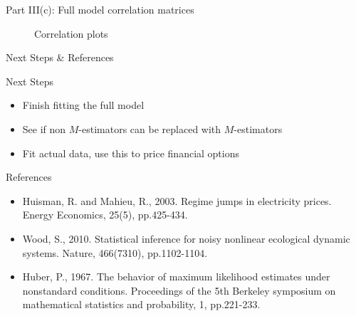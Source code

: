 \documentclass{beamer}
\begin{document}
\begin{frame}{Part III(c): Full model correlation matrices}
    \begin{figure}
        \centering
        \qquad
        \caption{Correlation plots}
    \end{figure}
\end{frame}


\begin{frame}{Next Steps \& References}
\begin{block}{Next Steps}
    \begin{itemize}
    \item Finish fitting the full model
    \item See if non $M$-estimators can be replaced with $M$-estimators
    \item Fit actual data, use this to price financial options
\end{itemize}
\end{block}

\begin{block}{References}
    \begin{itemize}
        \item Huisman, R. and Mahieu, R., 2003. Regime jumps in electricity prices. Energy Economics, 25(5), pp.425-434.
        \item Wood, S., 2010. Statistical inference for noisy nonlinear ecological dynamic systems. Nature, 466(7310), pp.1102-1104.
        \item Huber, P., 1967. The behavior of maximum likelihood estimates under nonstandard conditions. Proceedings of the 5th Berkeley symposium on mathematical statistics and probability, 1, pp.221-233.
    \end{itemize}
\end{block}

\end{frame}
\end{document}
